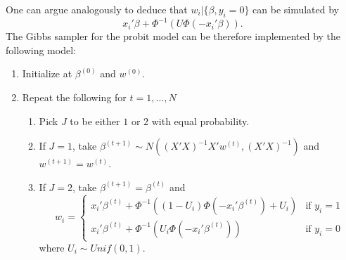 \documentclass{scrartcl}
\begin{document}
One can argue analogously to deduce that $w_i | \{\beta, y_i = 0\}$
can be simulated by
\begin{equation*}
  x_i' \beta + \Phi^{-1} \left(U \Phi(-x_i' \beta) \right). 
\end{equation*}
The Gibbs sampler for the probit model can be therefore implemented by
the following model: 
\begin{enumerate}
\item Initialize at $\beta^{(0)}$ and $w^{(0)}$.
\item Repeat the following for $t = 1, \dots, N$
  \begin{enumerate}
  \item Pick $J$ to be either $1$ or $2$ with equal probability.
  \item If $J = 1$, take $\beta^{(t+1)} \sim N((X'X)^{-1} X'
    w^{(t)}, (X' X)^{-1})$ and $w^{(t+1)} = w^{(t)}$.
  \item If $J = 2$, take $\beta^{(t+1)} = \beta^{(t)}$ and
    \[
 w_i = 
  \begin{cases} 
x_i' \beta^{(t)}  + \Phi^{-1}  \left((1 - U_i) \Phi(-x_i' \beta^{(t)}) + U_i \right) &
\text{if } y_i = 1 \\
x_i' \beta^{(t)} + \Phi^{-1} \left(U_i \Phi(-x_i' \beta^{(t)}) \right)        &
\text{if } y_i = 0
  \end{cases}
\]
where $U_i \sim Unif(0, 1)$. 
  \end{enumerate}
\end{enumerate}










  


\end{document}
